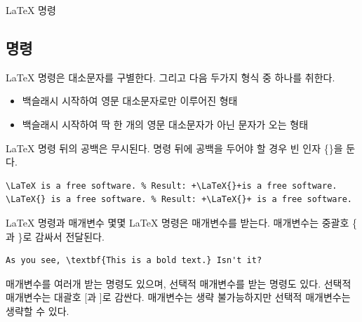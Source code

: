 \documentclass{beamer}
\begin{document}
\begin{frame}[fragile]{\LaTeX{} 명령}
    \subsection{명령}

    \LaTeX{} 명령은 대소문자를 구별한다. 그리고 다음 두가지 형식 중 하나를 취한다.
    \begin{itemize}
        \item 백슬래시  시작하여 영문 대소문자로만 이루어진 형태
        \item 백슬래시  시작하여 딱 한 개의 영문 대소문자가 아닌 문자가 오는 형태
    \end{itemize}

    \LaTeX{} 명령 뒤의 공백은 무시된다. 명령 뒤에 공백을 두어야 할 경우 빈 인자 \{\}을 둔다.
    \begin{lstlisting}[escapeinside=++]
\LaTeX is a free software. % Result: +\LaTeX{}+is a free software.
\LaTeX{} is a free software. % Result: +\LaTeX{}+ is a free software.
    \end{lstlisting}
\end{frame}

\begin{frame}[fragile]{\LaTeX{} 명령과 매개변수}
    몇몇 \LaTeX{} 명령은 매개변수를 받는다. 매개변수는 중괄호 \{ 과 \}로 감싸서 전달된다.
    \begin{lstlisting}[numbers=none]
As you see, \textbf{This is a bold text.} Isn't it?
    \end{lstlisting}

    매개변수를 여러개 받는 명령도 있으며, 선택적 매개변수를 받는 명령도 있다. 선택적 매개변수는 대괄호 [과 ]로 감싼다. 매개변수는 생략 불가능하지만 선택적 매개변수는 생략할 수 있다.
\end{frame}
\end{document}
